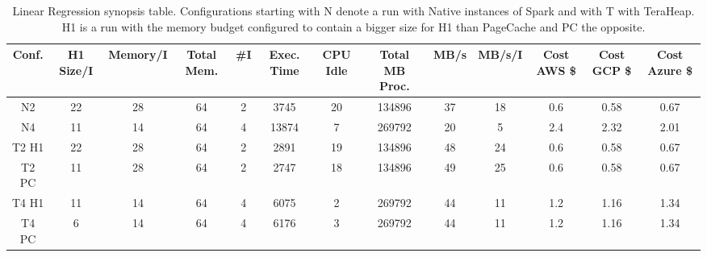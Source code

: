 \begin{table}[htbp]
	\begin{subtable}[b]{0.45\linewidth}
  \caption{Linear Regression synopsis table. Configurations starting
    with N denote a run with Native instances of Spark and with T with
    TeraHeap. H1 is a run with the memory budget configured to contain
    a bigger size for H1 than PageCache and PC the opposite.}
  \label{tab:linr_table}
        \begin{tabular}{|c|c|c|c|c|c|c|c|c|c|c|c|c|}
      \hline
\textbf{Conf.} & \textbf{H1 Size/I} & \textbf{Memory/I} & \textbf{Total Mem.} & \textbf{\#I} & \textbf{Exec. Time} & \textbf{CPU Idle} & \textbf{Total MB Proc.} & \textbf{MB/s} & \textbf{MB/s/I} & \textbf{Cost AWS \$} & \textbf{Cost GCP \$} & \textbf{Cost Azure \$} \\
	\hline 
      N2 & 22 & 28 & 64 & 2 & 3745 & 20 & 134896 & 37 & 18 & 0.6 & 0.58 & 0.67 \\ 
      N4 & 11 & 14 & 64 & 4 & 13874 & 7 & 269792 & 20 & 5 & 2.4 & 2.32 & 2.01 \\
      T2 H1 & 22 & 28 & 64 & 2 & 2891 & 19 & 134896 & 48 & 24 & 0.6 & 0.58 & 0.67 \\
      T2 PC & 11 & 28 & 64 & 2 & 2747 & 18 & 134896 & 49 & 25 & 0.6 & 0.58 & 0.67 \\
      T4 H1 & 11 & 14 & 64 & 4 & 6075 & 2 & 269792 & 44 & 11 & 1.2 & 1.16 & 1.34 \\
      T4 PC & 6 & 14 & 64 & 4 & 6176 & 3 & 269792 & 44 & 11 & 1.2 & 1.16 & 1.34 \\ 
      \hline
     \end{tabular}%
\end{subtable}
	\vspace{1em}
\end{table}

